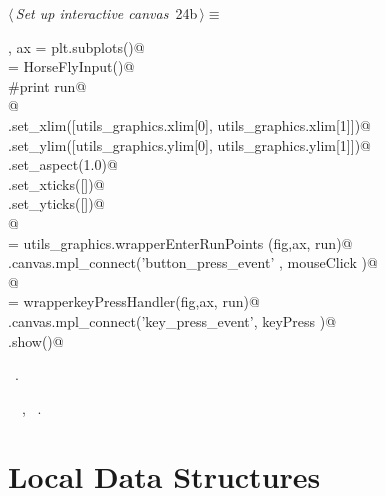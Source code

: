 \documentclass[11.5pt]{report}
\begin{document}
\begin{flushleft} \small\label{scrap17}\raggedright\small
{} $\langle\,${\itshape Set up interactive canvas}\nobreak\ {\footnotesize {24b}}$\,\rangle\equiv$
\vspace{-1ex}
\begin{list}{}{} \item
\mbox{}\verb@fig, ax =  plt.subplots()@\\
\mbox{}\verb@run = HorseFlyInput()@\\
\mbox{}\verb@#print run@\\
\mbox{}\verb@    @\\
\mbox{}\verb@ax.set_xlim([utils_graphics.xlim[0], utils_graphics.xlim[1]])@\\
\mbox{}\verb@ax.set_ylim([utils_graphics.ylim[0], utils_graphics.ylim[1]])@\\
\mbox{}\verb@ax.set_aspect(1.0)@\\
\mbox{}\verb@ax.set_xticks([])@\\
\mbox{}\verb@ax.set_yticks([])@\\
\mbox{}\verb@      @\\
\mbox{}\verb@mouseClick   = utils_graphics.wrapperEnterRunPoints (fig,ax, run)@\\
\mbox{}\verb@fig.canvas.mpl_connect('button_press_event' , mouseClick )@\\
\mbox{}\verb@      @\\
\mbox{}\verb@keyPress     = wrapperkeyPressHandler(fig,ax, run)@\\
\mbox{}\verb@fig.canvas.mpl_connect('key_press_event', keyPress   )@\\
\mbox{}\verb@plt.show()@\\
\mbox{}\verb@@{\NWsep}
\end{list}
\vspace{-1.5ex}
\footnotesize
\begin{list}{}{\setlength{\itemsep}{-\parsep}\setlength{\itemindent}{-\leftmargin}}
\item \NWtxtMacroRefIn\ .
\item \NWtxtIdentsUsed\nobreak\  \verb@HorseFlyInput@\nobreak\ , \verb@wrapperkeyPressHandler@\nobreak\ .
\item{}
\end{list}
\vspace{4ex}
\end{flushleft}
\section{Local Data Structures}
\end{document}
